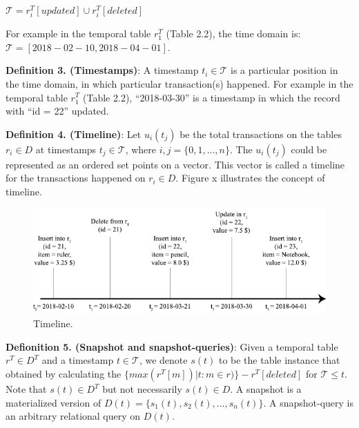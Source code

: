 \begin{center}
	$\mathcal{T} = r_i^T[updated] \cup r_i^T[deleted]$
\end{center}
For example in the temporal table $r_1^T$ (Table 2.2), the time domain is:
$\mathcal{T} = [2018-02-10,2018-04-01]$.

\textbf{Definition 3. (Timestamps)}: A timestamp $t_i \in \mathcal{T}$ is a particular position in the time domain, in which particular transaction(s) happened. For example in the temporal table $r_1^T$ (Table 2.2), ``2018-03-30'' is a timestamp in which the record with ``id = 22'' updated.

\textbf{Definition 4. (Timeline)}: Let $u_i(t_j)$ be the total transactions on the tables $r_i \in D$ at timestamps $t_j \in \mathcal{T}$, where $i,j=\{0,1,...,n\}$. The $u_i(t_j)$ could be represented as an ordered set points on a vector. This vector is called a timeline for the transactions happened on $r_i \in D$. Figure x illustrates the concept of timeline.
\begin{figure}
	\label{fig:timeline}
	\centering
	\includegraphics[width=\textwidth]{figs/timeline.pdf}
	\caption{Timeline.}
\end{figure}

\textbf{Defionition 5. (Snapshot and snapshot-queries)}: Given a temporal table $r^T \in D^T$ and a timestamp $t \in \mathcal{T}$, we denote $s(t)$ to be the table instance that obtained by calculating the $\{max(r^T[m])|t : m\in r)\}-r^T[deleted]$ for $\mathcal{T}\leq t$. Note that $s(t) \in D^T$ but not necessarily $s(t) \in D$. A snapshot is a materialized version of $D(t) = \{s_1(t),s_2(t),...,s_n(t)\}$. A snapshot-query is an arbitrary relational query on $D(t)$.\\

